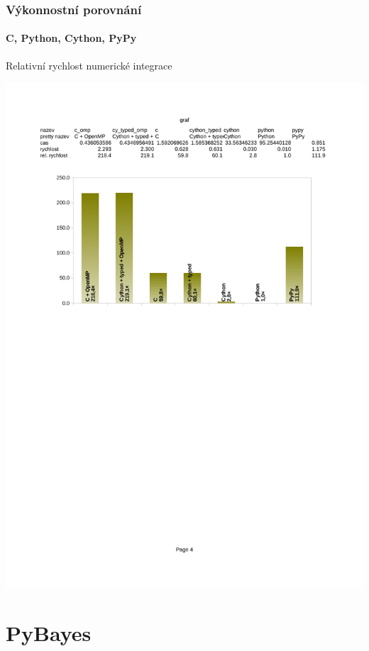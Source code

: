 \documentclass[12pt]{beamer}
\begin{document}
\begin{frame}
	\frametitle{Výkonnostní porovnání}
	\framesubtitle{C, Python, Cython, PyPy}

	Relativní rychlost numerické integrace
	\vspace{5mm}

	\includegraphics[width=\textwidth,keepaspectratio=true,clip=true,trim=30mm 166mm 30mm
54mm]{./edgy-results.pdf}
\end{frame}

\section{PyBayes}
\end{document}
